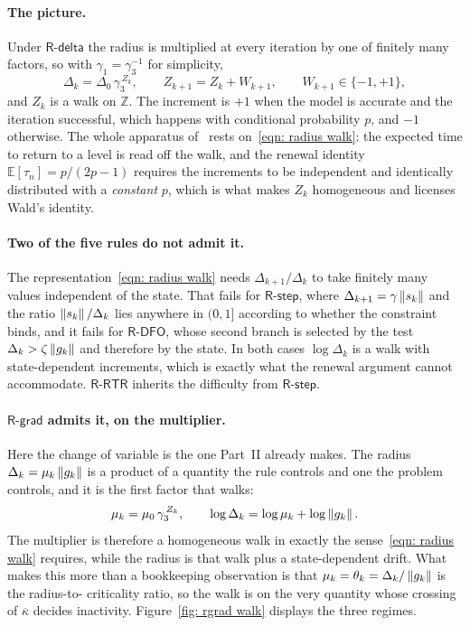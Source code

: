 \documentclass[11pt]{article}
\theoremstyle{plain}
\theoremstyle{definition}
\theoremstyle{remark}
\numberwithin{equation}{section}
\newcommand{\Rdelta}{\textsf{R-delta}}
\newcommand{\Rstep}{\textsf{R-step}}
\newcommand{\Rdfo}{\textsf{R-DFO}}
\newcommand{\Rgrad}{\textsf{R-grad}}
\newcommand{\Rrtr}{\textsf{R-RTR}}
\providecommand{\kbar}{\overline{\kappa}}
\providecommand{\E}{\mathbb{E}}
\providecommand{\kbar}{\overline{\kappa}}
\begin{document}
\paragraph{The picture.}
Under $\Rdelta$ the radius is multiplied at every iteration by one of finitely many factors, so
with $\gamma_1 = \gamma_3^{-1}$ for simplicity,
\begin{equation}
  \Delta_k = \Delta_0 \, \gamma_3^{\,Z_k} ,
  \qquad
  Z_{k+1} = Z_k + W_{k+1} ,
  \qquad W_{k+1} \in \{-1,+1\} ,
  \label{eqn: radius walk}
\end{equation}
and $Z_k$ is a walk on $\mathbb{Z}$. The increment is $+1$ when the model is accurate and the
iteration successful, which happens with conditional probability $p$, and $-1$ otherwise. The
whole apparatus of~\citet{BlanchetCartisMenickellyScheinberg19} rests
on~\eqref{eqn: radius walk}: the expected time to return to a level is read off the walk, and the
renewal identity $\E[\tau_n] = p/(2p-1)$ requires the increments to be independent and identically
distributed with a \emph{constant} $p$, which is what makes $Z_k$ homogeneous and licenses Wald's
identity.

\paragraph{Two of the five rules do not admit it.}
The representation~\eqref{eqn: radius walk} needs $\Delta_{k+1}/\Delta_k$ to take finitely many
values independent of the state. That fails for $\Rstep$, where
$\Delta_{k+1} = \gamma\left \lVert s_k \right \rVert$ and the ratio $\left \lVert s_k \right \rVert/\Delta_k$ lies anywhere in $(0,1]$
according to whether the constraint binds, and it fails for $\Rdfo$, whose second branch is
selected by the test $\Delta_k > \zeta\left \lVert g_k \right \rVert$ and therefore by the state. In both cases
$\log\Delta_k$ is a walk with state-dependent increments, which is exactly what the renewal
argument cannot accommodate. $\Rrtr$ inherits the difficulty from $\Rstep$.

\paragraph{$\Rgrad$ admits it, on the multiplier.}
Here the change of variable is the one Part~II already makes. The radius
$\Delta_k = \mu_k\left \lVert g_k \right \rVert$ is a product of a quantity the rule controls and one the problem
controls, and it is the first factor that walks:
\begin{equation}
  \mu_k = \mu_0\,\gamma_3^{\,Z_k} ,
  \qquad
  \log\Delta_k = \log\mu_k + \log\left \lVert g_k \right \rVert .
  \label{eqn: mu walk}
\end{equation}
The multiplier is therefore a homogeneous walk in exactly the sense~\eqref{eqn: radius walk}
requires, while the radius is that walk plus a state-dependent drift. What makes this more than a
bookkeeping observation is that $\mu_k = \theta_k = \Delta_k/\left \lVert g_k \right \rVert$ is the radius-to-%
criticality ratio, so the walk is on the very quantity whose crossing of $\kbar$ decides
inactivity. Figure~\ref{fig: rgrad walk} displays the three regimes.
\end{document}
